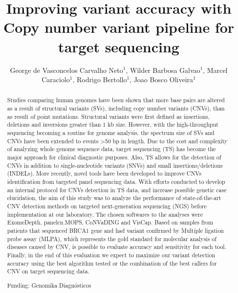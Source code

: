 \documentclass[twoside]{article}
\title{\vspace{-15mm}\fontsize{24pt}{10pt}\selectfont\textbf{Improving variant accuracy with Copy number variant pipeline for target sequencing}} %
\author{George de Vasconcelos Carvalho Neto$^1$, Wilder Barbosa Galvao$^1$, Marcel Caraciolo$^1$, Rodrigo Bertollo$^1$, Joao Bosco Oliveira$^1$}
\affil{1 GENOMIKA\\ }
\date{}
\begin{document}
\maketitle %

\thispagestyle{fancy} %


\begin{abstract}
Studies comparing human genomes have been shown that more base pairs are altered as a result of structural variants (SVs), including copy number variants (CNVs), than as result of point mutations. Structural variants were first defined as insertions, deletions and inversions greater than 1 kb size. However, with the high-throughput sequencing becoming a routine for genome analysis, the spectrum size of SVs and CNVs have been extended to events >50 bp in length. Due to the cost and complexity of analyzing whole genome sequence data, target sequencing (TS) has become the major approach for clinical diagnostic purposes. Also, TS allows for the detection of CNVs in addition to single-nucleotide variants (SNVs) and small insertions/deletions (INDELs). More recently, novel tools have been developed to improve CNVs identification from targeted panel sequencing data. With efforts conducted to develop an internal protocol for CNVs detection in TS data, and increase possible genetic case elucidation, the aim of this study was to analyze the performance of state-of-the-art CNV detection methods on targeted next-generation sequencing (NGS) before implementation at our laboratory. The chosen softwares to the analyses were ExomeDepth, panelcn.MOPS, CoNVaDING and VisCap. Based on samples from patients that sequenced BRCA1 gene and had variant confirmed by Multiple ligation probe assay (MLPA), which  represents the gold standard for molecular analysis of diseases caused by CNV, is possible to evaluate accuracy and sensitivity for each tool. Finally, in the end of this evaluation we expect to maximize our variant detection accuracy using the best algorithm tested or the combination of the best callers for CNV on target sequencing data.

Funding: Genomika Diagn\'osticos
\end{abstract}
\end{document}
